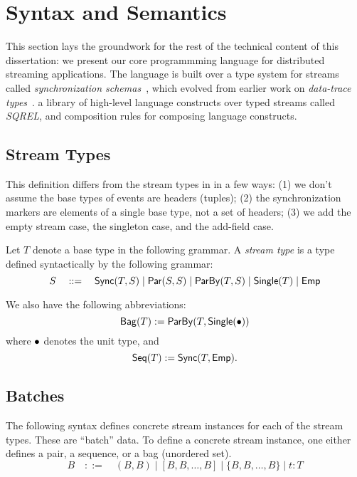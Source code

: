 \section{Syntax and Semantics}

This section lays the groundwork for the rest of the technical content of this dissertation: we present our core programmming language for distributed streaming applications. The language is built over a type system for streams called \emph{synchronization schemas}~, which evolved from earlier work on \emph{data-trace types}~. a library of high-level language constructs over typed streams called \emph{SQREL}, and composition rules for composing language constructs.
\cite{StreamQRE}

\subsection{Stream Types}

This definition differs from the stream types in  in a few ways: (1) we don't assume the base types of events are headers (tuples); (2) the synchronization markers are elements of a single base type, not a set of headers; (3) we add the empty stream case, the singleton case, and the add-field case.

\begin{definition}
Let $T$ denote a base type in the following grammar.
A \emph{stream type} is a type defined syntactically by the following grammar:
\[
  S \quad ::= \quad
    \mathsf{Sync}({T}, S) \mid
    \mathsf{Par}({S}, {S}) \mid
    \mathsf{ParBy}({T}, S) \mid
    \mathsf{Single}(T) \mid
    \mathsf{Emp}{}
\]
\end{definition}

We also have the following abbreviations:
\[
  \mathsf{Bag}({T}) := \mathsf{ParBy}({T}, \mathsf{Single}(\bullet{}))
\]
where $\bullet{}$ denotes the unit type, and
\[
  \mathsf{Seq}({T}) := \mathsf{Sync}({T}, \mathsf{Emp}{}).
\]

\subsection{Batches}

The following syntax defines concrete stream instances for each of the
stream types.
These are ``batch'' data.
To define a concrete stream instance, one either defines a pair, a sequence, or a bag (unordered set).
\[
  B \quad ::= \quad
    (B, B) \mid
    [B, B, \ldots, B] \mid
    \{B, B, \ldots, B\} \mid
    t: T
\]

